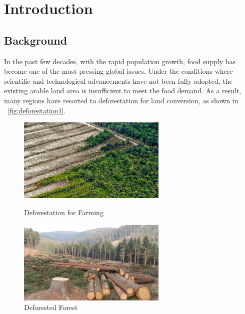 \documentclass{HZNUMCM}
\begin{document}
\showSummarySheet
\newpage %
\showContents
  \section{Introduction}
    \subsection{Background}
    In the past few decades, with the rapid population growth, 
    food supply has become one of the most pressing global issues. 
    Under the conditions where scientific and technological advancements have not been fully adopted, 
    the existing arable land area is insufficient to meet the food demand. 
    As a result, many regions have resorted to deforestation for land conversion, 
    as shown in \figurename~\ref{fig:deforestation1}. 
    \begin{figure}[H]
      \centering
        \begin{minipage}[b]{0.45\linewidth}
            \centering
            \includegraphics[height=4cm, keepaspectratio]{images/deforestation1.jpg} %
            \caption{Deforestation for Farming}
            \label{fig:deforestation1}
        \end{minipage}
      \hspace{0.05\linewidth}
        \begin{minipage}[b]{0.45\linewidth}
            \centering
            \includegraphics[height=4cm, keepaspectratio]{images/deforestation2.jpg} %
            \caption{Deforested Forest}
            \label{fig:deforestation2}
        \end{minipage}
      \end{figure}
\end{document}

